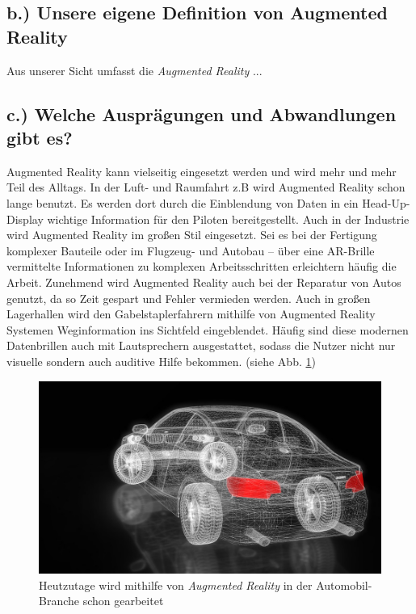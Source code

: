 \documentclass[12pt,utf8]{scrartcl}
\begin{document}
\begin{flushleft}
\subsection{\label{sub2:thema}b.) Unsere eigene Definition von Augmented Reality}

Aus unserer Sicht umfasst die \textit{Augmented Reality} ...

\subsection{\label{sub3:thema}c.) Welche Ausprägungen und Abwandlungen gibt es?}

Augmented Reality kann vielseitig eingesetzt werden und wird mehr und mehr Teil des Alltags. In der Luft- und Raumfahrt z.B wird Augmented Reality schon lange benutzt. Es werden dort durch die Einblendung von Daten in ein Head-Up-Display wichtige Information für den Piloten bereitgestellt. Auch in der Industrie wird Augmented Reality im großen Stil eingesetzt. Sei es bei der Fertigung komplexer Bauteile oder im Flugzeug- und Autobau – über eine AR-Brille vermittelte Informationen zu komplexen Arbeitsschritten erleichtern häufig die Arbeit. Zunehmend wird Augmented Reality auch bei der Reparatur von Autos genutzt, da so Zeit gespart und Fehler vermieden werden. Auch in großen Lagerhallen wird den Gabelstaplerfahrern mithilfe von Augmented Reality Systemen Weginformation ins Sichtfeld eingeblendet. Häufig sind diese modernen Datenbrillen auch mit Lautsprechern ausgestattet, sodass die Nutzer nicht nur visuelle sondern auch auditive Hilfe bekommen. (siehe Abb. \ref{fig:autoholo})
\linebreak

\begin{figure}[H]
	\centering
	\includegraphics[width=0.8\linewidth]{images/autoholo}
	\caption{Heutzutage wird mithilfe von \textit{Augmented Reality} in der Automobil-Branche schon gearbeitet\cite{online5}}
	\label{fig:autoholo}
\end{figure}


\end{flushleft}
\end{document}

